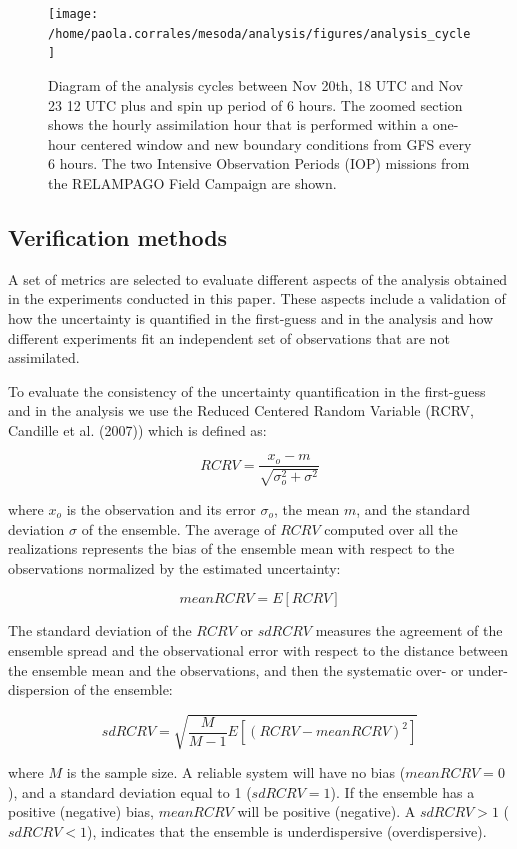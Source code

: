 \documentclass[final,5p,times,twocolumn,authoryear]{elsarticle} %
\begin{document}
\begin{figure}
\texttt{[image: /home/paola.corrales/mesoda/analysis/figures/analysis\_cycle]} \caption{Diagram of the analysis cycles between Nov 20th, 18 UTC and Nov 23 12 UTC plus and spin up period of 6 hours. The zoomed section shows the hourly assimilation hour that is performed within a one-hour centered window and new boundary conditions from GFS every 6 hours. The two Intensive Observation Periods (IOP) missions from the RELAMPAGO Field Campaign are shown.}\label{fig:cycle}
\end{figure}

\hypertarget{verification-methods}{%
\subsection{Verification methods}\label{verification-methods}}

A set of metrics are selected to evaluate different aspects of the analysis obtained in the experiments conducted in this paper. These aspects include a validation of how the uncertainty is quantified in the first-guess and in the analysis and how different experiments fit an independent set of observations that are not assimilated.

To evaluate the consistency of the uncertainty quantification in the first-guess and in the analysis we use the Reduced Centered Random Variable (RCRV, Candille et al. (2007)) which is defined as:

\[RCRV = \frac{x_o - m}{\sqrt{\sigma_o^2 + \sigma^2}}\]

where \(x_o\) is the observation and its error \(\sigma_o\), the mean \(m\), and the standard deviation \(\sigma\) of the ensemble.
The average of \(RCRV\) computed over all the realizations represents the bias of the ensemble mean with respect to the observations normalized by the estimated uncertainty:

\[\mathit{mean RCRV} = E[RCRV]\]

The standard deviation of the \(RCRV\) or \(sd RCRV\) measures the agreement of the ensemble spread and the observational error with respect to the distance between the ensemble mean and the observations, and then the systematic over- or under- dispersion of the ensemble:

\[\mathit{sd RCRV} = \sqrt{\frac{M}{M -1}E[(\mathit{RCRV} - \mathit{mean RCRV})^2]}\]

where \(M\) is the sample size. A reliable system will have no bias (\(mean RCRV = 0\)), and a standard deviation equal to 1 (\(sd RCRV = 1\)). If the ensemble has a positive (negative) bias, \(mean RCRV\) will be positive (negative). A \(sd RCRV > 1\) (\(sd RCRV < 1\)), indicates that the ensemble is underdispersive (overdispersive).
\end{document}
